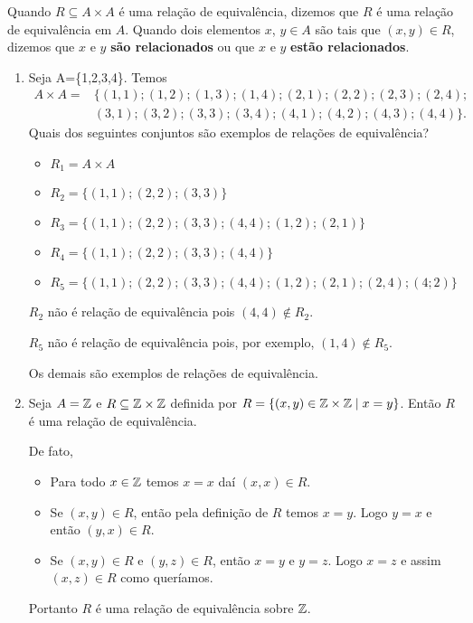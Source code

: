 Quando $R\subseteq A \times A$ é uma relação de equivalência, dizemos que $R$ é uma relação de equivalência em $A$. Quando dois elementos $x$, $y \in A$ são tais que $(x,y) \in R$, dizemos que $x$ e $y$ \textbf{são relacionados} ou que $x$ e $y$ \textbf{estão relacionados}.

\begin{exemplos}\label{exemplos_relacoes_equivalencia}
    \begin{enumerate}[label={\arabic*})]
        \item Seja A=\{1,2,3,4\}. Temos
        \begin{align*}
            A\times A = &\{(1,1);(1,2);(1,3);(1,4);(2,1);(2,2);(2,3);(2,4);\\ &(3,1);(3,2);(3,3);(3,4);(4,1);(4,2);(4,3);(4,4)\}.
        \end{align*}
        Quais dos seguintes conjuntos são exemplos de relações de equivalência?
        \begin{itemize}
            \item $R_{1}= A\times A$
            \item $R_{2}=\{(1,1);(2,2);(3,3)\}$
            \item $R_{3}=\{(1,1);(2,2);(3,3);(4,4);(1,2);(2,1)\}$
            \item $R_{4}=\{(1,1);(2,2);(3,3);(4,4)\}$
            \item $R_{5}=\{(1,1);(2,2);(3,3);(4,4);(1,2);(2,1);(2,4);(4;2)\}$
        \end{itemize}
        \begin{solucao}
            $R_2$ não é relação de equivalência pois $(4,4) \notin R_2$.

            $R_5$ não é relação de equivalência pois, por exemplo, $(1,4) \notin R_5$.

            Os demais são exemplos de relações de equivalência.
        \end{solucao}

        \item Seja $A = \mathbb{Z}$ e $R\subseteq \mathbb{Z}\times \mathbb{Z}$ definida por $R = \{(x,y)\in \mathbb{Z} \times \mathbb{Z} \mid x = y\}$.
        Então $R$ é uma relação de equivalência.
        \begin{solucao}
            De fato,
            \begin{itemize}
                \item Para todo $x \in \mathbb{Z}$ temos $x = x$ daí $(x,x) \in R$.
                \item Se $(x,y)\in R$, então pela definição de $R$ temos $x = y$. Logo $y = x$ e então $(y,x)\in R$.
                \item Se $(x,y) \in R$ e $(y,z) \in R$, então  $x = y$ e $y = z$. Logo $x = z$ e assim $(x,z)\in R$ como queríamos.
            \end{itemize}
            Portanto $R$ é uma relação de equivalência sobre $\mathbb{Z}$.
        \end{solucao}


\end{enumerate}
\end{exemplos}
